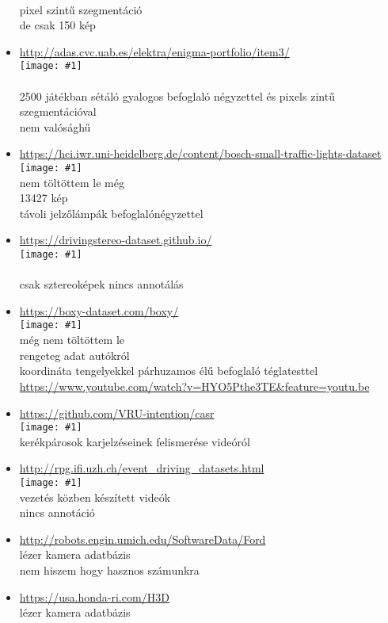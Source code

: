 \documentclass[12pt]{report}
\newcommand{\img}[1]{\texttt{[image: \#1]}}
\begin{document}
\begin{itemize}
	\\pixel szintű szegmentáció
	\\de csak 150 kép
	\item \url{http://adas.cvc.uab.es/elektra/enigma-portfolio/item3/}
	\\\img{12}
	\\
	\\2500 játékban sétáló gyalogos befoglaló négyzettel és pixels zintű szegmentációval
	\\nem valósághű 
	\item \url{https://hci.iwr.uni-heidelberg.de/content/bosch-small-traffic-lights-dataset}
	\\\img{13}
	\\nem töltöttem le még
	\\13427 kép
	\\távoli jelzőlámpák befoglalónégyzettel
	\item \url{https://drivingstereo-dataset.github.io/}
	\\\img{14}
	\\
	\\csak sztereoképek nincs annotálás
	\item \url{https://boxy-dataset.com/boxy/}
	\\\img{15}
	\\még nem töltöttem le
	\\rengeteg adat autókról
	\\koordináta tengelyekkel párhuzamos élű befoglaló téglatesttel
	\\\url{https://www.youtube.com/watch?v=HYO5Pthe3TE&feature=youtu.be}
	\item \url{https://github.com/VRU-intention/casr}
	\\\img{16}
	\\kerékpárosok karjelzéseinek felismerése videóról
	\item \url{http://rpg.ifi.uzh.ch/event_driving_datasets.html}
	\\\img{17}
	\\vezetés közben készített videók
	\\nincs annotáció
	\item \url{http://robots.engin.umich.edu/SoftwareData/Ford}
	\\lézer kamera adatbázis
	\\nem hiszem hogy hasznos számunkra
	\item \url{https://usa.honda-ri.com/H3D}
	\\lézer kamera adatbázis

\end{itemize}
\end{document}
